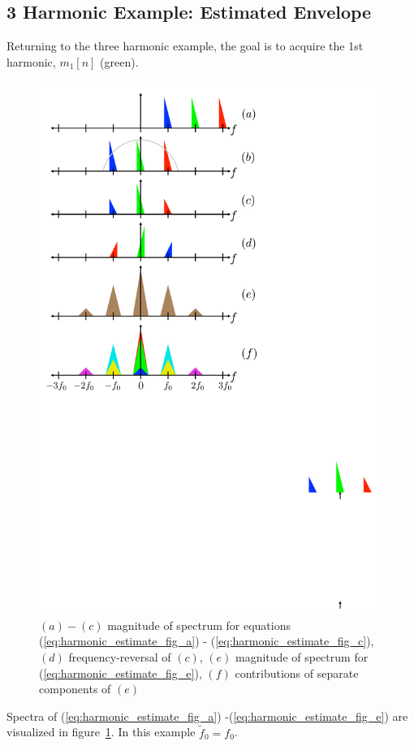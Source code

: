 \documentclass [11pt, proquest,oneside] {ganter_thesis}[2015/03/03]
\begin{document}
\subsection{3 Harmonic Example: Estimated Envelope}

Returning to the three harmonic example, the goal is to acquire the 1st harmonic, $m_1[n]$ (green).

\begin{figure}[!ht]
  \centering
    \includegraphics[width=.62\textwidth]{harmonic_envelope_estimate} 
        \caption{$(a)-(c)$ magnitude of spectrum for equations (\ref{eq:harmonic_estimate_fig_a}) - (\ref{eq:harmonic_estimate_fig_c}), $(d)$ frequency-reversal of $(c)$, $(e)$ magnitude of spectrum for (\ref{eq:harmonic_estimate_fig_e}), $(f)$ contributions of separate components of $(e)$}\label{fig:harmonic_envelope_estimate}
\end{figure}

Spectra of (\ref{eq:harmonic_estimate_fig_a}) -(\ref{eq:harmonic_estimate_fig_e}) are visualized in figure~\ref{fig:harmonic_envelope_estimate}.  In this example $\tilde{f}_0 = f_0$.
\end{document}
